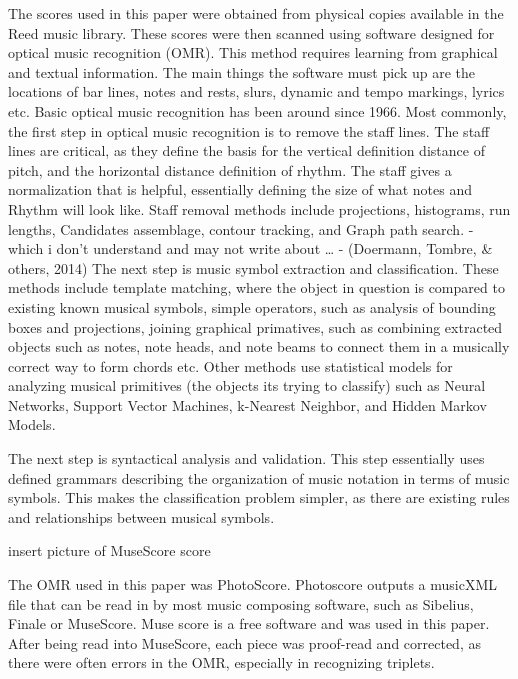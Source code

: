 \documentclass[12pt,twoside]{reedthesis}
\theoremstyle{definition}
\theoremstyle{definition}
\theoremstyle{definition}
\theoremstyle{remark}
\begin{document}
The scores used in this paper were obtained from physical copies
available in the Reed music library. These scores were then scanned
using software designed for optical music recognition (OMR). This method
requires learning from graphical and textual information. The main
things the software must pick up are the locations of bar lines, notes
and rests, slurs, dynamic and tempo markings, lyrics etc. Basic optical
music recognition has been around since 1966. Most commonly, the first
step in optical music recognition is to remove the staff lines. The
staff lines are critical, as they define the basis for the vertical
definition distance of pitch, and the horizontal distance definition of
rhythm. The staff gives a normalization that is helpful, essentially
defining the size of what notes and Rhythm will look like. Staff removal
methods include projections, histograms, run lengths, Candidates
assemblage, contour tracking, and Graph path search. - which i don't
understand and may not write about \ldots{} - (Doermann, Tombre, \&
others, 2014) The next step is music symbol extraction and
classification. These methods include template matching, where the
object in question is compared to existing known musical symbols, simple
operators, such as analysis of bounding boxes and projections, joining
graphical primatives, such as combining extracted objects such as notes,
note heads, and note beams to connect them in a musically correct way to
form chords etc. Other methods use statistical models for analyzing
musical primitives (the objects its trying to classify) such as Neural
Networks, Support Vector Machines, k-Nearest Neighbor, and Hidden Markov
Models.

The next step is syntactical analysis and validation. This step
essentially uses defined grammars describing the organization of music
notation in terms of music symbols. This makes the classification
problem simpler, as there are existing rules and relationships between
musical symbols.

insert picture of MuseScore score

The OMR used in this paper was PhotoScore. Photoscore outputs a musicXML
file that can be read in by most music composing software, such as
Sibelius, Finale or MuseScore. Muse score is a free software and was
used in this paper. After being read into MuseScore, each piece was
proof-read and corrected, as there were often errors in the OMR,
especially in recognizing triplets.
\end{document}

